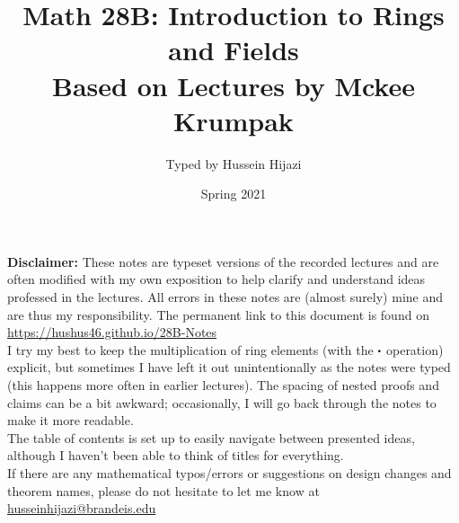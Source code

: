 \documentclass[../Main.tex]{subfiles}
\begin{document}
\title{\textbf {Math 28B: Introduction to Rings and Fields}\\[0.2em]\large Based on Lectures by Mckee Krumpak\vspace{-2ex} }
\author{Typed by Hussein Hijazi}
\date{Spring 2021}
\begin{minipage}{\textwidth}
\maketitle
\textbf{Disclaimer:} These notes are typeset versions of the recorded lectures and are often modified with my own exposition to help clarify and understand ideas professed in the lectures. All errors in these notes are (almost surely) mine and are thus my responsibility. The permanent link to this document is found on \href{https://hushus46.github.io/28B-Notes/}{https://hushus46.github.io/28B-Notes}\\

I try my best to keep the multiplication of ring elements (with the $\rdot $ operation) explicit, but sometimes I have left it out unintentionally as the notes were typed (this happens more often in earlier lectures). The spacing of nested proofs and claims can be a bit awkward; occasionally, I will go back through the notes to make it more readable.\\

The table of contents is set up to easily navigate between presented ideas, although I haven't been able to think of titles for everything.\\ 

If there are any mathematical typos/errors or suggestions on design changes and theorem names, please do not hesitate to let me know at \href{mailto:husseinhijazi@brandeis.edu}{husseinhijazi@brandeis.edu}\\


\end{minipage}
\end{document}
